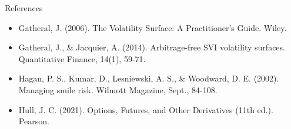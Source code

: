 \documentclass[aspectratio=169,10pt]{beamer}
\begin{document}
\begin{frame}{References}
\scriptsize\begin{itemize}\setlength{\itemsep}{3pt}
  \item Gatheral, J. (2006). The Volatility Surface: A Practitioner's Guide. Wiley.
  \item Gatheral, J., \& Jacquier, A. (2014). Arbitrage-free SVI volatility surfaces. Quantitative Finance, 14(1), 59-71.
  \item Hagan, P. S., Kumar, D., Lesniewski, A. S., \& Woodward, D. E. (2002). Managing smile risk. Wilmott Magazine, Sept., 84-108.
  \item Hull, J. C. (2021). Options, Futures, and Other Derivatives (11th ed.). Pearson.
\end{itemize}
\end{frame}
\end{document}
